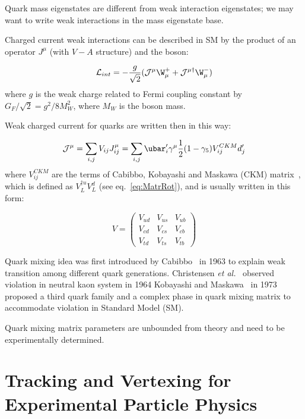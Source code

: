 Quark mass eigenstates are different from weak interaction
 eigenstates; we may want to write weak interactions in the mass
 eigenstate base.

Charged current weak interactions can be described in SM by the product of
 an operator $J^{\mu}$ (with $V-A$ structure) and the \W boson:

\begin{equation}
\mathcal{L}_{int}=-\frac{g}{\sqrt{2}}(\mathcal{J^{\mu}}\W_{\mu}^{+}+\mathcal{J^{\mu\dagger}}\W_{\mu}^{-})
\label{eq:LintWeak}
\end{equation}
where $g$ is the weak charge related to Fermi coupling constant by 
$G_F/\sqrt{2}=g^2/8M_W^2$, where $M_W$ is the \W boson mass.

Weak charged current for quarks are written then in this way:

\begin{equation}
\mathcal{J}^{\mu} = \sum_{i,j} V_{ij}J^{\mu}_{ij} = 
\sum_{i,j}\ubar_i' \gamma^{\mu}\frac{1}{2}(1-\gamma_5)V^{CKM}_{ij}d_j'
\label{eq:ChCurr}
\end{equation}
where $V^{CKM}_{ij}$ are the terms of Cabibbo, Kobayashi and Maskawa (CKM) 
matrix~\cite{PhysRevLett.10.531,Kobayashi:1973fv}, which is defined as $V_L^{\dagger u}V_L^{d}$ 
(see eq.~\ref{eq:MatrRot}), and is usually written in this form:

\begin{equation}
V=
\left( \begin{array}{ccc}
V_{ud} & V_{us} & V_{ub} \\
V_{cd} & V_{cs} & V_{cb} \\
V_{td} & V_{ts} & V_{tb}
\end{array} \right)
\label{eq:CKM}
\end{equation}


Quark mixing idea was first introduced by Cabibbo~\cite{PhysRevLett.10.531} in 1963 
to explain weak transition among different quark generations. 
Christensen {\it et al.}~\cite{PhysRevLett.13.138} observed \CP violation in
 neutral kaon system in 1964 
 Kobayashi and Maskawa~\cite{Kobayashi:1973fv} in 1973 proposed a third quark family and a
 complex phase in quark mixing matrix to accommodate \CP violation in
 Standard Model (SM).

Quark mixing matrix parameters are unbounded from theory and need to be 
experimentally determined. 

\section{Tracking and Vertexing for Experimental Particle Physics}

